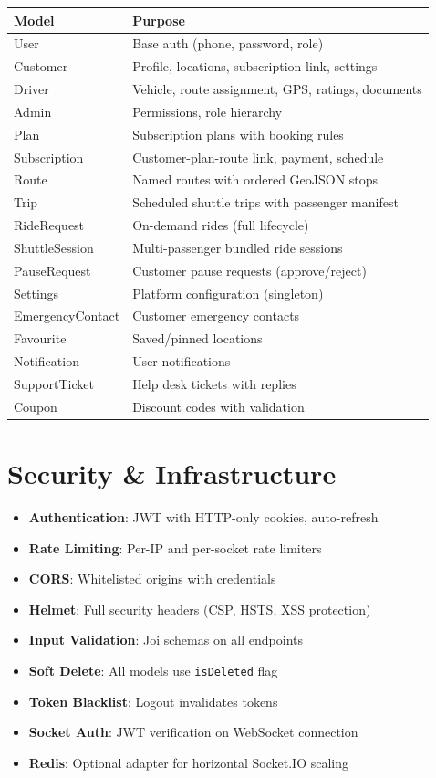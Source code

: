 \documentclass[11pt,a4paper]{article}
\begin{document}
\begin{longtable}{lp{8cm}}
\toprule
\textbf{Model} & \textbf{Purpose} \\
\midrule
User & Base auth (phone, password, role) \\
Customer & Profile, locations, subscription link, settings \\
Driver & Vehicle, route assignment, GPS, ratings, documents \\
Admin & Permissions, role hierarchy \\
Plan & Subscription plans with booking rules \\
Subscription & Customer-plan-route link, payment, schedule \\
Route & Named routes with ordered GeoJSON stops \\
Trip & Scheduled shuttle trips with passenger manifest \\
RideRequest & On-demand rides (full lifecycle) \\
ShuttleSession & Multi-passenger bundled ride sessions \\
PauseRequest & Customer pause requests (approve/reject) \\
Settings & Platform configuration (singleton) \\
EmergencyContact & Customer emergency contacts \\
Favourite & Saved/pinned locations \\
Notification & User notifications \\
SupportTicket & Help desk tickets with replies \\
Coupon & Discount codes with validation \\
\bottomrule
\end{longtable}

\section{Security \& Infrastructure}

\begin{itemize}
  \item \textbf{Authentication}: JWT with HTTP-only cookies, auto-refresh
  \item \textbf{Rate Limiting}: Per-IP and per-socket rate limiters
  \item \textbf{CORS}: Whitelisted origins with credentials
  \item \textbf{Helmet}: Full security headers (CSP, HSTS, XSS protection)
  \item \textbf{Input Validation}: Joi schemas on all endpoints
  \item \textbf{Soft Delete}: All models use \texttt{isDeleted} flag
  \item \textbf{Token Blacklist}: Logout invalidates tokens
  \item \textbf{Socket Auth}: JWT verification on WebSocket connection
  \item \textbf{Redis}: Optional adapter for horizontal Socket.IO scaling
\end{itemize}
\end{document}
